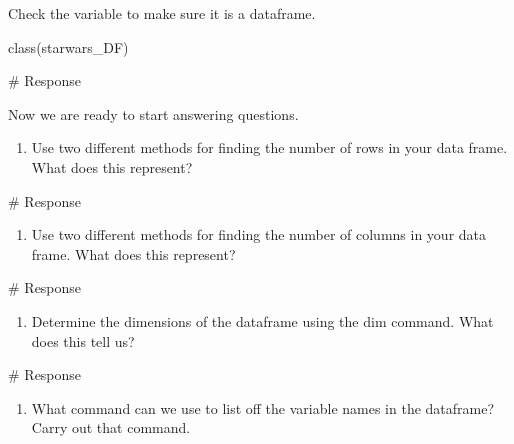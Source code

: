 \documentclass[
  letterpaper,
  DIV=11,
  numbers=noendperiod]{scrreprt}
\newenvironment{Shaded}{\begin{snugshade}}{\end{snugshade}}
\newcommand{\CommentTok}[1]{\textcolor[rgb]{0.37,0.37,0.37}{#1}}
\providecommand{\tightlist}{%
  \setlength{\itemsep}{0pt}\setlength{\parskip}{0pt}}\usepackage{longtable,booktabs,array}
\begin{document}
Check the variable to make sure it is a dataframe.

class(starwars\_DF)

\begin{Shaded}
\begin{Highlighting}[]
\CommentTok{\# Response}
\end{Highlighting}
\end{Shaded}

Now we are ready to start answering questions.

\begin{enumerate}
\def\labelenumi{\arabic{enumi}.}
\tightlist
\item
  Use two different methods for finding the number of rows in your data
  frame. What does this represent?
\end{enumerate}

\begin{Shaded}
\begin{Highlighting}[]
\CommentTok{\# Response}
\end{Highlighting}
\end{Shaded}

\begin{enumerate}
\def\labelenumi{\arabic{enumi}.}
\setcounter{enumi}{1}
\tightlist
\item
  Use two different methods for finding the number of columns in your
  data frame. What does this represent?
\end{enumerate}

\begin{Shaded}
\begin{Highlighting}[]
\CommentTok{\# Response}
\end{Highlighting}
\end{Shaded}

\begin{enumerate}
\def\labelenumi{\arabic{enumi}.}
\setcounter{enumi}{2}
\tightlist
\item
  Determine the dimensions of the dataframe using the dim command. What
  does this tell us?
\end{enumerate}

\begin{Shaded}
\begin{Highlighting}[]
\CommentTok{\# Response}
\end{Highlighting}
\end{Shaded}

\begin{enumerate}
\def\labelenumi{\arabic{enumi}.}
\setcounter{enumi}{3}
\tightlist
\item
  What command can we use to list off the variable names in the
  dataframe? Carry out that command.
\end{enumerate}
\end{document}
